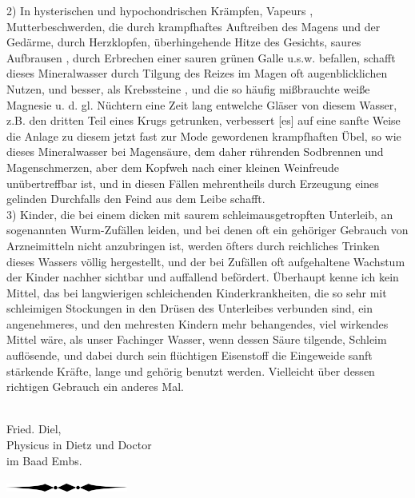\documentclass[11pt,a5paper,twoside]{memoir}
\begin{document}
2) In hysterischen und hypochondrischen Krämpfen, Vapeurs%
, 
Mutterbeschwerden, 
die durch krampfhaftes Auftreiben des Magens und der Gedärme, 
durch Herzklopfen, überhingehende Hitze des Gesichts, 
saures Aufbrausen%
, 
durch Erbrechen einer sauren grünen Galle u.s.w. befallen, 
schafft dieses Mineralwasser 
durch Tilgung des Reizes im Magen oft  augenblicklichen Nutzen, 
und besser, als Krebssteine%
, 
und die so häufig mißbrauchte weiße Magnesie%
u. d. gl. Nüchtern eine Zeit lang entwelche Gläser von diesem Wasser, 
z.B. den dritten Teil eines Krugs getrunken, 
verbessert [es] auf eine sanfte Weise die Anlage 
zu diesem jetzt fast zur Mode gewordenen krampfhaften Übel, 
so wie dieses Mineralwasser bei Magensäure, 
dem daher rührenden Sodbrennen und Magenschmerzen, 
aber dem Kopfweh nach einer kleinen Weinfreude unübertreffbar ist, 
und in diesen Fällen mehrentheils 
durch Erzeugung eines gelinden Durchfalls 
den Feind aus dem Leibe schafft.\\

3) Kinder, die bei einem dicken mit saurem schleimausgetropften Unterleib, 
an sogenannten Wurm-Zufällen leiden, 
und bei denen oft ein gehöriger Gebrauch 
von  Arzneimitteln nicht anzubringen ist, 
werden öfters durch reichliches Trinken dieses Wassers völlig hergestellt, 
und der bei Zufällen oft aufgehaltene Wachstum der Kinder 
nachher sichtbar und auffallend befördert. 
Überhaupt kenne ich kein Mittel, 
das bei langwierigen schleichenden Kinderkrankheiten, 
die so sehr mit schleimigen Stockungen 
in den Drüsen des Unterleibes verbunden sind, 
ein angenehmeres, und den mehresten Kindern mehr behangendes, 
viel wirkendes Mittel wäre, 
als unser Fachinger Wasser, 
wenn dessen Säure tilgende, Schleim auflösende, 
und dabei durch sein flüchtigen Eisenstoff 
die Eingeweide sanft stärkende Kräfte, 
lange und gehörig benutzt werden. 
Vielleicht über dessen richtigen Gebrauch ein anderes Mal.\\
\\

\hfill
\begin{minipage}{6cm}
  \centering
{\Large Fried. Diel,}\\
Physicus in Dietz und Doctor\\
im Baad Embs.
\end{minipage}

\vfill
\begin{center}
\includegraphics[width=4cm]{figures/div2}
\end{center}
\vfill

\newpage
\fancyhead[C]{}
\mbox{}
\newpage
\end{document}
